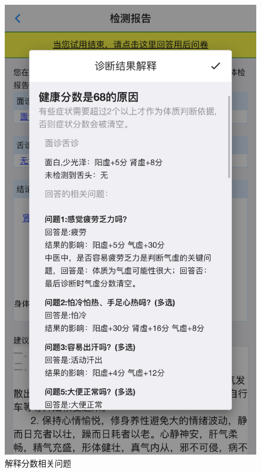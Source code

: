 \begin{figure}
    \centering
    \includegraphics{images/report7.png}
    \caption{解释分数相关问题}
    \label{fig:report_expalin_score_1}
\end{figure}

